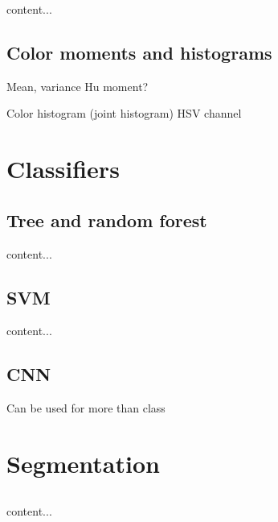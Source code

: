 \documentclass[aspectratio=169]{beamer}
\let\oldsection\section
\renewcommand{\section}[1]{
    \oldsection{#1}	
    \subsection{}
}
\newenvironment{myframe}[1][t]{\begin{frame}[#1]{\secname}{\subsecname}}{\end{frame}}
\begin{document}
    \begin{myframe}
        content...
    \end{myframe}
    
    \subsection{Color moments and histograms}
    
    \begin{myframe}
        Mean, variance
        Hu moment?
        
        Color histogram (joint histogram)
        HSV channel
    \end{myframe}
    
    \section{Classifiers}
    
    \subsection{Tree and random forest}
    
    \begin{myframe}
        content...
    \end{myframe}
    
    \subsection{SVM}
    
    \begin{myframe}
        content...
    \end{myframe}
    
    \subsection{CNN}
    
    \begin{myframe}
        Can be used for more than class
    \end{myframe}
    
    \section{Segmentation}
    
    \begin{myframe}
        content...
    \end{myframe}
    
\end{document}
